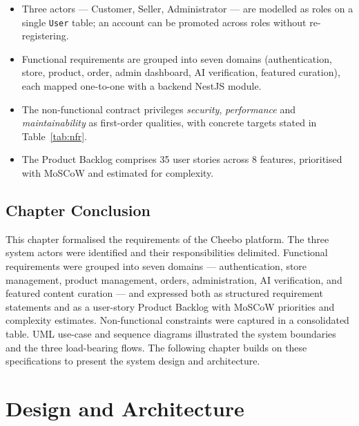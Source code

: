 \documentclass[12pt, a4paper, oneside]{report}
\newenvironment{keytakeaways}{%
  \par\bigskip
  \begin{mdframed}[
    backgroundcolor=cheebolightgray,
    linecolor=cheeboblue,
    linewidth=3pt,
    topline=false,
    bottomline=false,
    rightline=false,
    innerleftmargin=14pt,
    innerrightmargin=14pt,
    innertopmargin=10pt,
    innerbottommargin=10pt
  ]
  \noindent{\bfseries\color{cheeboblue}\large Key Takeaways}\par
  \vspace{4pt}
  \small
}{%
  \end{mdframed}
}
\begin{document}
\begin{keytakeaways}
\begin{itemize}[leftmargin=*,itemsep=2pt]
  \item Three actors --- Customer, Seller, Administrator --- are
        modelled as roles on a single \texttt{User} table; an
        account can be promoted across roles without re-registering.
  \item Functional requirements are grouped into seven domains
        (authentication, store, product, order, admin dashboard,
        AI verification, featured curation), each mapped one-to-one
        with a backend NestJS module.
  \item The non-functional contract privileges \emph{security},
        \emph{performance} and \emph{maintainability} as
        first-order qualities, with concrete targets stated in
        Table~\ref{tab:nfr}.
  \item The Product Backlog comprises 35 user stories across 8
        features, prioritised with MoSCoW and estimated for
        complexity.
\end{itemize}
\end{keytakeaways}

\section*{Chapter Conclusion}

This chapter formalised the requirements of the Cheebo platform.
The three system actors were identified and their responsibilities
delimited. Functional requirements were grouped into seven domains
--- authentication, store management, product management, orders,
administration, AI verification, and featured content curation ---
and expressed
both as structured requirement statements and as a user-story
Product Backlog with MoSCoW priorities and complexity estimates.
Non-functional constraints were captured in a consolidated table.
UML use-case and sequence diagrams illustrated the system boundaries
and the three load-bearing flows. The following chapter builds on
these specifications to present the system design and architecture.

\chapter{Design and Architecture}
\end{document}
